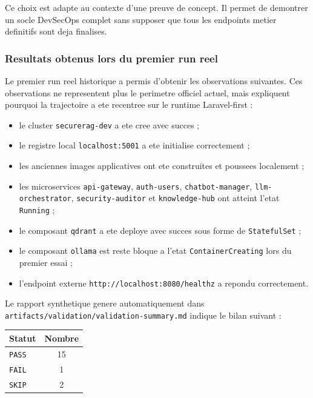 Ce choix est adapte au contexte d'une preuve de concept. Il permet de demontrer un socle DevSecOps complet sans supposer que tous les endpoints metier definitifs sont deja finalises.

\subsubsection{Resultats obtenus lors du premier run reel}

Le premier run reel historique a permis d'obtenir les observations suivantes. Ces observations ne representent plus le perimetre officiel actuel, mais expliquent pourquoi la trajectoire a ete recentree sur le runtime Laravel-first :

\begin{itemize}
  \item le cluster \texttt{securerag-dev} a ete cree avec succes ;
  \item le registre local \texttt{localhost:5001} a ete initialise correctement ;
  \item les anciennes images applicatives ont ete construites et poussees localement ;
  \item les microservices \texttt{api-gateway}, \texttt{auth-users}, \texttt{chatbot-manager}, \texttt{llm-orchestrator}, \texttt{security-auditor} et \texttt{knowledge-hub} ont atteint l'etat \texttt{Running} ;
  \item le composant \texttt{qdrant} a ete deploye avec succes sous forme de \texttt{StatefulSet} ;
  \item le composant \texttt{ollama} est reste bloque a l'etat \texttt{ContainerCreating} lors du premier essai ;
  \item l'endpoint externe \texttt{http://localhost:8080/healthz} a repondu correctement.
\end{itemize}

Le rapport synthetique genere automatiquement dans \texttt{artifacts/validation/validation-summary.md} indique le bilan suivant :

\begin{center}
\begin{tabular}{|l|c|}
\hline
Statut & Nombre \\
\hline
\texttt{PASS} & 15 \\
\texttt{FAIL} & 1 \\
\texttt{SKIP} & 2 \\
\hline
\end{tabular}
\end{center}


